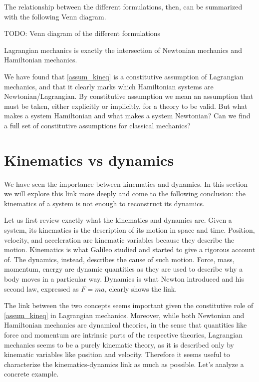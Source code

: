 The relationship between the different formulations, then, can be summarized with the following Venn diagram.

TODO: Venn diagram of the different formulations

Lagrangian mechanics is exactly the intersection of Newtonian mechanics and Hamiltonian mechanics.

We have found that \ref{assum_kineq} is a constitutive assumption of Lagrangian mechanics, and that it clearly marks which Hamiltonian systems are Newtonian/Lagrangian. By constitutive assumption we mean an assumption that must be taken, either explicitly or implicitly, for a theory to be valid. But what makes a system Hamiltonian and what makes a system Newtonian? Can we find a full set of constitutive assumptions for classical mechanics?

\section{Kinematics vs dynamics}

We have seen the importance between kinematics and dynamics. In this section we will explore this link more deeply and come to the following conclusion: the kinematics of a system is not enough to reconstruct its dynamics. 

Let us first review exactly what the kinematics and dynamics are. Given a system, its kinematics is the description of its motion in space and time. Position, velocity, and acceleration are kinematic variables because they describe the motion. Kinematics is what Galileo studied and started to give a rigorous account of. The dynamics, instead, describes the cause of such motion. Force, mass, momentum, energy are dynamic quantities as they are used to describe why a body moves in a particular way. Dynamics is what Newton introduced and his second law, expressed as $F=ma$, clearly shows the link.

The link between the two concepts seems important given the constitutive role of \ref{assum_kineq} in Lagrangian mechanics. Moreover, while both Newtonian and Hamiltonian mechanics are dynamical theories, in the sense that quantities like force and momentum are intrinsic parts of the respective theories, Lagrangian mechanics seems to be a purely kinematic theory, as it is described only by kinematic variables like position and velocity. Therefore it seems useful to characterize the kinematics-dynamics link as much as possible. Let's analyze a concrete example.

